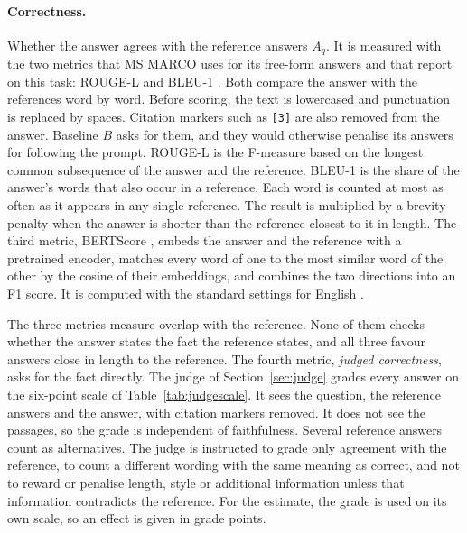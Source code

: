 \documentclass[12pt,a4paper,oneside]{scrreprt}
\begin{document}
\paragraph{Correctness.} Whether the answer agrees with the reference answers $A_q$. It is measured with the two metrics that MS MARCO uses for its free-form answers \citep{nguyen2016msmarco} and that \citet{lewis2020rag} report on this task: ROUGE-L \citep{lin2004rouge} and BLEU-1 \citep{papineni2002bleu}. Both compare the answer with the references word by word. Before scoring, the text is lowercased and punctuation is replaced by spaces. Citation markers such as \texttt{[3]} are also removed from the answer. Baseline $B$ asks for them, and they would otherwise penalise its answers for following the prompt. ROUGE-L is the F-measure based on the longest common subsequence of the answer and the reference. BLEU-1 is the share of the answer's words that also occur in a reference. Each word is counted at most as often as it appears in any single reference. The result is multiplied by a brevity penalty when the answer is shorter than the reference closest to it in length. The third metric, BERTScore \citep{zhang2020bertscore}, embeds the answer and the reference with a pretrained encoder, matches every word of one to the most similar word of the other by the cosine of their embeddings, and combines the two directions into an F1 score. It is computed with the standard settings for English \citep{liu2019roberta}.

The three metrics measure overlap with the reference. None of them checks whether the answer states the fact the reference states, and all three favour answers close in length to the reference. The fourth metric, \textit{judged correctness}, asks for the fact directly. The judge of Section~\ref{sec:judge} grades every answer on the six-point scale of Table~\ref{tab:judgescale}. It sees the question, the reference answers and the answer, with citation markers removed. It does not see the passages, so the grade is independent of faithfulness. Several reference answers count as alternatives. The judge is instructed to grade only agreement with the reference, to count a different wording with the same meaning as correct, and not to reward or penalise length, style or additional information unless that information contradicts the reference. For the estimate, the grade is used on its own scale, so an effect is given in grade points.
\end{document}
